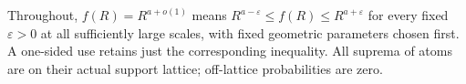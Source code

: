 Throughout, $f(R)=R^{a+o(1)}$ means
$R^{a-\varepsilon}\le f(R)\le R^{a+\varepsilon}$ for every fixed
$\varepsilon>0$ at all sufficiently large scales, with fixed geometric
parameters chosen first. A one-sided use retains just the corresponding
inequality. All suprema of atoms are on their actual support lattice;
off-lattice probabilities are zero.
